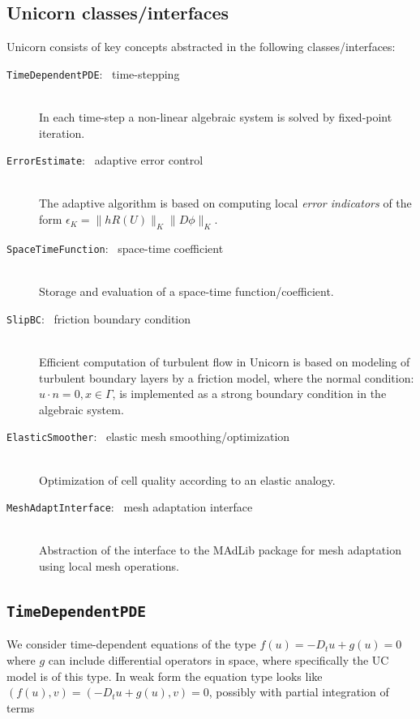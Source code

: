 \subsection{Unicorn classes/interfaces}

Unicorn consists of key concepts abstracted in the following
classes/interfaces:

\begin{description}
\item[{\tt TimeDependentPDE}: \ time-stepping]
\ \\
In each time-step a non-linear algebraic system is solved by
fixed-point iteration.
\item[{\tt ErrorEstimate}: \ adaptive error control]
\ \\
The adaptive algorithm is based on computing local {\em error
indicators} of the form $\epsilon_K = \|h R(U)\|_K \|D \phi\|_K$.

\item[{\tt SpaceTimeFunction}: \ space-time coefficient]
\ \\
Storage and evaluation of a space-time function/coefficient.
\item[{\tt SlipBC}: \ friction boundary condition]
\ \\
Efficient computation of turbulent flow in Unicorn is based on
modeling of turbulent boundary layers by a friction model, where the
normal condition: $u \cdot n = 0, x \in \Gamma$, is implemented as a
strong boundary condition in the algebraic system.
\item[{\tt ElasticSmoother}: \ elastic mesh smoothing/optimization]
\ \\
Optimization of cell quality according to an elastic analogy.
\item[{\tt MeshAdaptInterface}: \ mesh adaptation interface]
\ \\
Abstraction of the interface to the MAdLib package for mesh adaptation
using local mesh operations.
\end{description}

\subsection{\tt TimeDependentPDE}

We consider time-dependent equations of the type $f(u) = -D_t u + g(u)
= 0$ where $g$ can include differential operators in space, where
specifically the UC model is of this type. In weak form the equation
type looks like$(f(u), v) = (-D_t u + g(u), v) = 0$, possibly with
partial integration of terms

